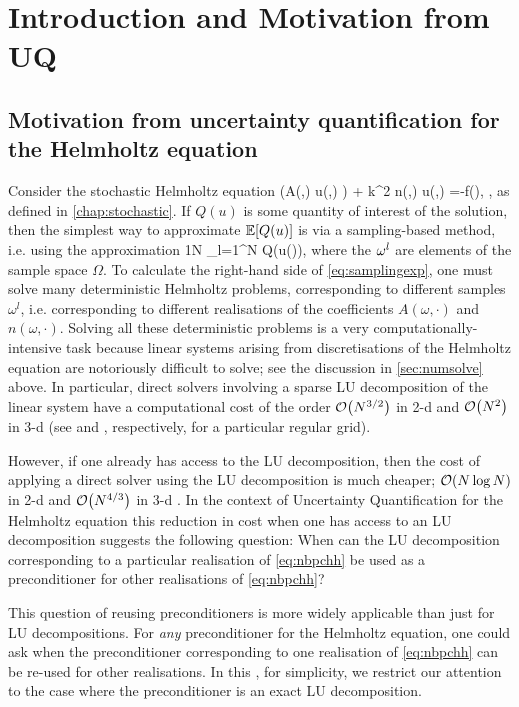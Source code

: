 \section{Introduction and Motivation from UQ}\label{sec:intronbpc}

\subsection{Motivation from uncertainty quantification for the Helmholtz equation} 
Consider the stochastic Helmholtz equation 
\beq\label{eq:nbpchh}
\nabla\cdot\big(A(\omega,\bx) \nabla u(\omega,\bx) \big) + k^2 n(\omega,\bx) u(\omega,\bx) =-f(\bx), \quad \bx\in\Dp,
\eeq
as defined in \cref{chap:stochastic}. If $Q(u)$ is some quantity of interest of the solution, then the simplest way to approximate $\EXP{Q(u)}$ is via a sampling-based method, i.e. using the approximation
\beq\label{eq:samplingexp}
 \approx \frac1N \sum_{l=1}^N Q(u(\omegasl)),
\eeq
where the $\omega^{l}$ are elements of the sample space $\Omega.$ To calculate the right-hand side of \cref{eq:samplingexp},  one must solve many deterministic Helmholtz problems, corresponding to different samples $\omega^l$, i.e. corresponding to different realisations of the coefficients $A(\omega,\cdot)$ and $n(\omega,\cdot)$.
Solving all these deterministic problems is a very computationally-intensive task because linear systems arising from discretisations of the Helmholtz equation are notoriously difficult to solve; see the discussion in \cref{sec:numsolve} above. In particular, direct solvers involving a sparse LU decomposition of the linear system have a computational cost of the order $\cO\mleft(N^{3/2}\mright)$ in 2-d  and $\cO\mleft(N^2\mright)$ in 3-d (see \cite[Section 1]{DuErRe:76} and \cite[Equation 3]{DuErRe:76}, respectively, for a particular regular grid).

However, if one already has access to the LU decomposition, then the cost of applying a direct solver using the LU decomposition is much cheaper; $\cO\mleft(N\log N\mright)$ in 2-d \cite[Section 1]{DuErRe:76} and $\cO\mleft(N^{4/3}\mright)$ in 3-d \cite[Equation 4]{DuErRe:76}. In the context of Uncertainty Quantification for the Helmholtz equation this reduction in cost when one has access to an LU decomposition suggests the following question: When can the LU decomposition corresponding to a particular realisation of \cref{eq:nbpchh} be used as a preconditioner for other realisations of \cref{eq:nbpchh}?

This question of reusing preconditioners is more widely applicable than just for LU decompositions. For \emph{any} preconditioner for the Helmholtz equation, one could ask when the preconditioner corresponding to one realisation of \cref{eq:nbpchh} can be re-used for other realisations. In this , for simplicity, we restrict our attention to the case where the preconditioner is an exact LU decomposition.

